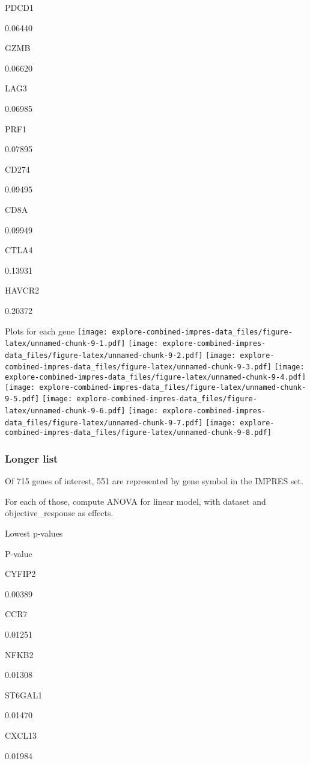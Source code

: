 \documentclass[]{article}
\begin{document}
PDCD1

0.06440

GZMB

0.06620

LAG3

0.06985

PRF1

0.07895

CD274

0.09495

CD8A

0.09949

CTLA4

0.13931

HAVCR2

0.20372

Plots for each gene
\texttt{[image: explore-combined-impres-data\_files/figure-latex/unnamed-chunk-9-1.pdf]}
\texttt{[image: explore-combined-impres-data\_files/figure-latex/unnamed-chunk-9-2.pdf]}
\texttt{[image: explore-combined-impres-data\_files/figure-latex/unnamed-chunk-9-3.pdf]}
\texttt{[image: explore-combined-impres-data\_files/figure-latex/unnamed-chunk-9-4.pdf]}
\texttt{[image: explore-combined-impres-data\_files/figure-latex/unnamed-chunk-9-5.pdf]}
\texttt{[image: explore-combined-impres-data\_files/figure-latex/unnamed-chunk-9-6.pdf]}
\texttt{[image: explore-combined-impres-data\_files/figure-latex/unnamed-chunk-9-7.pdf]}
\texttt{[image: explore-combined-impres-data\_files/figure-latex/unnamed-chunk-9-8.pdf]}

\subsubsection{Longer list}\label{longer-list}

Of 715 genes of interest, 551 are represented by gene symbol in the
IMPRES set.

For each of those, compute ANOVA for linear model, with dataset and
objective\_response as effects.

Lowest p-values

P-value

CYFIP2

0.00389

CCR7

0.01251

NFKB2

0.01308

ST6GAL1

0.01470

CXCL13

0.01984
\end{document}
